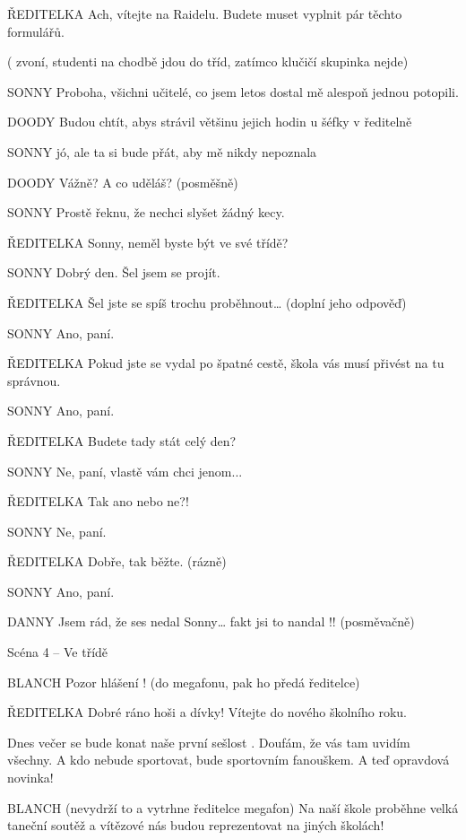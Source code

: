 ŘEDITELKA        Ach, vítejte na Raidelu. Budete muset vyplnit pár těchto formulářů.        

( zvoní, studenti na chodbě jdou do tříd, zatímco klučičí skupinka nejde)

SONNY         Proboha, všichni učitelé, co jsem letos dostal mě alespoň jednou potopili.

DOODY        Budou chtít, abys strávil většinu jejich hodin u šéfky v ředitelně

SONNY        jó, ale ta si bude přát, aby mě nikdy nepoznala

DOODY        Vážně? A co uděláš? (posměšně)

SONNY        Prostě řeknu, že nechci slyšet žádný kecy. 

ŘEDITELKA         Sonny, neměl byste být ve své třídě?

SONNY         Dobrý den. Šel jsem se projít.

ŘEDITELKA        Šel jste se spíš trochu proběhnout… (doplní jeho odpověď)

SONNY        Ano, paní.

ŘEDITELKA        Pokud jste se vydal po špatné cestě, škola vás musí přivést na tu                 správnou.

SONNY        Ano, paní.

ŘEDITELKA        Budete tady stát celý den?

SONNY        Ne, paní, vlastě vám chci jenom...

ŘEDITELKA        Tak ano nebo ne?!

SONNY        Ne, paní.

ŘEDITELKA        Dobře, tak běžte. (rázně)

SONNY        Ano, paní.

DANNY        Jsem rád, že ses nedal  Sonny… fakt jsi to nandal !! (posměvačně)

Scéna 4 – Ve třídě 

      BLANCH            Pozor hlášení ! (do megafonu, pak ho předá ředitelce)

        ŘEDITELKA                  Dobré ráno hoši a dívky! Vítejte do nového školního roku.

      Dnes večer se bude konat naše první sešlost . Doufám, že vás tam  uvidím všechny. A kdo nebude sportovat, bude sportovním fanouškem. A  teď opravdová novinka!  

      BLANCH            (nevydrží to a vytrhne ředitelce megafon) Na naší škole proběhne velká taneční soutěž  a vítězové nás budou reprezentovat na jiných školách!

